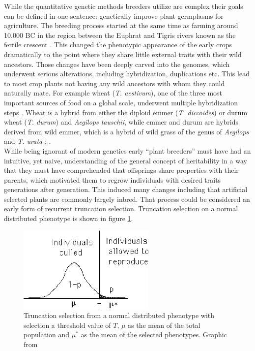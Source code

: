 While the quantitative genetic methods breeders utilize are complex their goals can be
defined in one sentence: genetically improve plant germplasms for agriculture. The
breeding process started at the same time as farming around 10,000 BC in the region
between the Euphrat and Tigris rivers known as the fertile crescent
\cite{kingsbury2009hybrid}. This changed the phenotypic appearance of the early crops
dramatically to the point where they share little external traits with their wild
ancestors. Those changes have been deeply carved into the genomes, which underwent serious
alterations, including hybridization, duplications etc. This lead to most crop plants not
having any wild ancestors with whom they could naturally mate. For example wheat
(\textit{T. aestivum}), one of the three most important sources of food on a global
scale, underwent multiple hybridization steps \cite{ozkan2001allopolyploidy}. Wheat is a
hybrid from either the diploid emmer (\textit{T. diccoides}) or durum wheat
(\textit{T. durum}) and \textit{{Aegilops tauschii}}, while emmer and durum are hybrids
derived from wild emmer, which is a hybrid of wild grass of the genus of \textit{Aegilops}
and \textit{T. urata} \cite{friebe2000development}; \cite{feldman2012genome}.\\
While being ignorant of modern genetics early ``plant breeders'' must have had an
intuitive, yet naive, understanding of the general concept of heritability in a way that
they must have comprehended that offsprings share properties with their parents, which
motivated them to regrow individuals with desired traits generations after
generation. This induced many changes including that artificial selected plants are
commonly largely inbred. That process could be considered an early form of recurrent
truncation selection. Truncation selection on a normal distributed phenotype is shown in
figure \ref{fig:trunSel}.
 
\begin{figure}[H]
  \centering \includegraphics[height=.25\textheight, width=0.6\textwidth]{Figures/truncSel} \decoRule
  \caption[Truncation selection of a normal distributed phenotype]{Truncation selection
    from a normal distributed phenotype with selection a threshold value of $T$, $\mu$ as
    the mean of the total population and $\mu^{\ast}$ as the mean of the selected
    phenotypes. Graphic from \cite{walsh2018short}}
 \label{fig:trunSel}
\end{figure}

